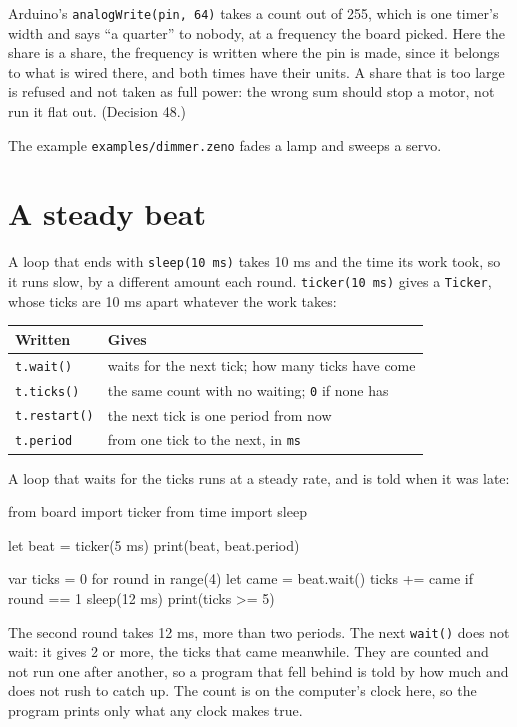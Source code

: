 \begin{why}
Arduino's \verb|analogWrite(pin, 64)| takes a count out of 255, which
is one timer's width and says ``a quarter'' to nobody, at a frequency
the board picked. Here the share is a share, the frequency is written
where the pin is made, since it belongs to what is wired there, and
both times have their units. A share that is too large is refused and
not taken as full power: the wrong sum should stop a motor, not run
it flat out. (Decision 48.)
\end{why}

The example \verb|examples/dimmer.zeno| fades a lamp and sweeps a
servo.

\section{A steady beat}

A loop that ends with \verb|sleep(10 ms)| takes 10 ms and the time its
work took, so it runs slow, by a different amount each round.
\verb|ticker(10 ms)| gives a \verb|Ticker|, whose ticks are 10 ms
apart whatever the work takes:

\begin{center}
\begin{tabular}{ll}
\toprule
Written & Gives \\
\midrule
\verb|t.wait()| & waits for the next tick; how many ticks have come \\
\verb|t.ticks()| & the same count with no waiting; \verb|0| if none has \\
\verb|t.restart()| & the next tick is one period from now \\
\verb|t.period| & from one tick to the next, in \verb|ms| \\
\bottomrule
\end{tabular}
\end{center}

A loop that waits for the ticks runs at a steady rate, and is told
when it was late:

\begin{zeno}
from board import ticker
from time import sleep

let beat = ticker(5 ms)
print(beat, beat.period)

var ticks = 0
for round in range(4) {
    let came = beat.wait()
    ticks += came
    if round == 1 {
        sleep(12 ms)
    }
}
print(ticks >= 5)
\end{zeno}

The second round takes 12 ms, more than two periods. The next
\verb|wait()| does not wait: it gives 2 or more, the ticks that came
meanwhile. They are counted and not run one after another, so a
program that fell behind is told by how much and does not rush to
catch up. The count is on the computer's clock here, so the program
prints only what any clock makes true.

